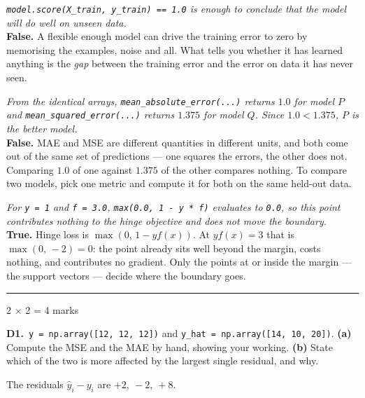 \documentclass[10pt,a4paper]{article}
\newcommand{\parthead}[2]{\vspace{2pt}\noindent\rule{\linewidth}{0.4pt}\par\vspace{2pt}%
  \noindent{\bfseries Part #1}\hfill{\small #2}\par\vspace{1pt}}
\begin{document}
\begin{sC}

  \item \emph{\texttt{model.score(X\_train, y\_train) == 1.0} is enough to conclude that the model will do well on unseen data.}\\[2pt] \textbf{False.} A flexible enough model can drive the training error to zero by memorising the examples, noise and all. What tells you whether it has learned anything is the \emph{gap} between the training error and the error on data it has never seen.

  \item \emph{From the identical arrays, \texttt{mean\_absolute\_error(...)} returns $1.0$ for model $P$ and \texttt{mean\_squared\_error(...)} returns $1.375$ for model $Q$. Since $1.0 < 1.375$, $P$ is the better model.}\\[2pt] \textbf{False.} MAE and MSE are different quantities in different units, and both come out of the same set of predictions --- one squares the errors, the other does not. Comparing $1.0$ of one against $1.375$ of the other compares nothing. To compare two models, pick one metric and compute it for both on the same held-out data.

  \item \emph{For \texttt{y = 1} and \texttt{f = 3.0}, \texttt{max(0.0, 1 - y * f)} evaluates to \texttt{0.0}, so this point contributes nothing to the hinge objective and does not move the boundary.}\\[2pt] \textbf{True.} Hinge loss is $\max(0,\,1 - y f(x))$. At $y f(x) = 3$ that is $\max(0,\,-2) = 0$: the point already sits well beyond the margin, costs nothing, and contributes no gradient. Only the points at or inside the margin --- the support vectors --- decide where the boundary goes.

\end{sC}

\newpage

\parthead{D --- Short answer}{2 $\times$ 2 = 4 marks}

\textbf{D1.}\ \texttt{y = np.array([12, 12, 12])} and \texttt{y\_hat = np.array([14, 10, 20])}. \textbf{(a)} Compute the MSE and the MAE by hand, showing your working. \textbf{(b)} State which of the two is more affected by the largest single residual, and why.

\vspace{2pt}

The residuals $\hat y_i - y_i$ are $+2,\ -2,\ +8$.
\end{document}
